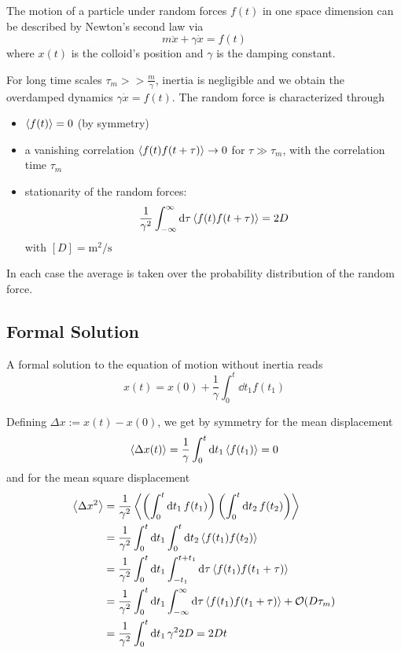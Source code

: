 \documentclass{notebook}
\begin{document}
%
\begin{theorem}
	The motion of a particle under random forces $f(t)$ in one space dimension can be described by Newton's second law via
	\begin{equation}
		m \ddot{x} + \gamma \dot{x} = f(t)
	\end{equation}
	where $x(t)$ is the colloid's position and $\gamma$ is the damping constant.
	
	For long time scales $\tau_m >> \frac{m}{\gamma}$, inertia is negligible and we obtain the overdamped dynamics $\gamma \dot{x} = f(t)$. The random force is characterized through
	\begin{itemize}
		\item{$\expval{f(t)} = 0$ (by symmetry)}
		\item{a vanishing correlation $\expval{f(t)f(t+\tau)} \to 0$ for $\tau \gg \tau_m$, with the correlation time $\tau_m$}
		\item{stationarity of the random forces: %
			\begin{equation}
				\frac{1}{\gamma^2}\int_{-\infty}^{\infty}{\dd{\tau} \expval{f(t)f(t+\tau)}} = 2D
			\end{equation}
			with $[D] = \si{\meter \squared \per \second}$}
	\end{itemize}
	In each case the average is taken over the probability distribution of the random force.
\end{theorem}
%


\subsection*{Formal Solution}

A formal solution to the equation of motion without inertia reads
%
\begin{equation}
x(t) = x(0) + \frac{1}{\gamma} \int_0^t{\dd{t_1} f(t_1)}
\end{equation}
%

Defining $\Delta x := x(t) - x(0)$, we get by symmetry for the mean displacement
%
\begin{equation}
\expval{\Delta x(t)} = \frac{1}{\gamma} \int_0^t{\dd{t_1} \expval{f(t_1)}} = 0
\end{equation}
%
and for the mean square displacement
%
\begin{align*}
\expval{\Delta x^2} &= \frac{1}{\gamma^2} \expval{\left( \int_0^t{\dd{t_1} f(t_1)} \right) \left( \int_0^t{\dd{t_2} f(t_2)} \right)} \\
&= \frac{1}{\gamma^2} \int_0^t \dd{t_1} \int_0^t{\dd{t_2} \expval{f(t_1) f(t_2)}} \\
&= \frac{1}{\gamma^2} \int_0^t \dd{t_1} \int_{-t_1}^{t+t_1}{\dd{\tau} \expval{f(t_1) f(t_1 + \tau)}}\\
&= \frac{1}{\gamma^2} \int_0^t \dd{t_1} \int_{-\infty}^{\infty}{\dd{\tau} \expval{f(t_1) f(t_1 + \tau)}} + \mathcal{O}(D \tau_m)\\		
&= \frac{1}{\gamma^2} \int_0^t{\dd{t_1} \gamma^2 2 D} = 2 D t
\end{align*}
%
\end{document}
